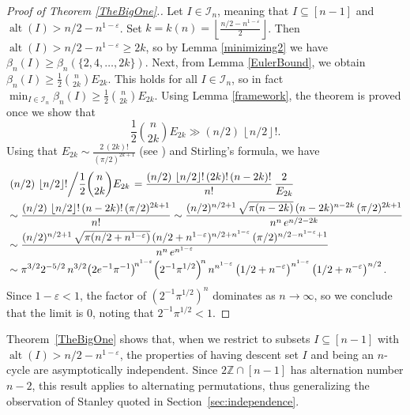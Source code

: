 \documentclass[12pt]{article}
\DeclareMathOperator{\alt}{alt}
\newcommand{\ZZ}{\mathbb{Z}}
\theoremstyle{definition}
\begin{document}
 \begin{proof}[Proof of Theorem \ref{TheBigOne}.] Let $I \in \mathcal{I}_n$, meaning that $I \subseteq [n-1]$ and $\alt(I) > n/2 - n^{1-\varepsilon}$. Set $k = k(n)= \left\lfloor \frac{n/2 - n^{1-\varepsilon}}{2} \right\rfloor$. Then $\alt(I) > n/2 - n^{1-\varepsilon} \ge 2k$, so by Lemma \ref{minimizing2} we have $\beta_n(I) \ge \beta_n(\{2, 4, \ldots, 2k\})$. Next, from Lemma \ref{EulerBound}, we obtain $\beta_n(I) \ge \frac12 \binom{n}{2k} E_{2k}$. This holds for all $I \in \mathcal{I}_n$, so in fact $\min_{I \in \mathcal{I}_n} \beta_n(I) \ge \frac12 \binom{n}{2k} E_{2k}$. Using Lemma \ref{framework}, the theorem is proved once we show that
$$ \frac12 \binom{n}{2k} E_{2k} \gg  (n/2)\,\left\lfloor n/2\right\rfloor!.$$
Using that $E_{2k} \sim \frac{2\,(2k)!}{(\pi/2)^{2k+1}}$ (see \cite[Note IV.35, p.\ 269]{FS}) and Stirling's formula, we have
\begin{align*}
& \left.(n/2)\,\left\lfloor n/2\right\rfloor! \middle/ \frac12 \binom{n}{2k} E_{2k} \right. 
= \frac{(n/2)\,\left\lfloor n/2\right\rfloor!\,(2k)!\,(n-2k)!}{n!} \,\frac{2}{E_{2k}} \\
&\sim \frac{(n/2)\,\left\lfloor n/2\right\rfloor!\,(n-2k)!\,(\pi/2)^{2k+1}}{n!}
\sim \frac{(n/2)^{n/2+1}\,\sqrt{\pi(n-2k)}\,(n-2k)^{n-2k}\,(\pi/2)^{2k+1}}{n^n\,e^{n/2-2k}} \\
&\sim \frac{(n/2)^{n/2+1}\,\sqrt{\pi(n/2+n^{1-\varepsilon})}\,(n/2+n^{1-\varepsilon})^{n/2+n^{1-\varepsilon}}\,(\pi/2)^{n/2-n^{1-\varepsilon}+1}}{n^n\,e^{n^{1-\varepsilon}}} \\
&\sim \pi^{3/2}2^{-5/2}\, n^{3/2} {\left(2e^{-1}\pi^{-1}\right)}^{\!n^{1-\varepsilon}} {\left(2^{-1}\pi^{1/2}\right)}^{\!n} \,n^{n^{1-\varepsilon}} \left(1/2+n^{-\varepsilon}\right)^{n^{1-\varepsilon}} \left(1/2+n^{-\varepsilon}\right)^{n/2}.
\end{align*}
Since $1-\varepsilon < 1$, the factor of ${\left(2^{-1}\pi^{1/2}\right)}^{\!n}$ dominates as $n\to\infty$, so we conclude that the limit is $0$, noting that $2^{-1}\pi^{1/2} < 1$.
\end{proof}

Theorem~\ref{TheBigOne} shows that, when we restrict to subsets $I \subseteq [n-1]$ with $\alt(I)>n/2 - n^{1-\varepsilon}$, the properties of having descent set $I$ and being an $n$-cycle are asymptotically independent. Since $2\ZZ\cap[n-1]$ has alternation number $n-2$, this result applies to alternating permutations, thus generalizing the observation of Stanley quoted in Section~\ref{sec:independence}.
\end{document}
